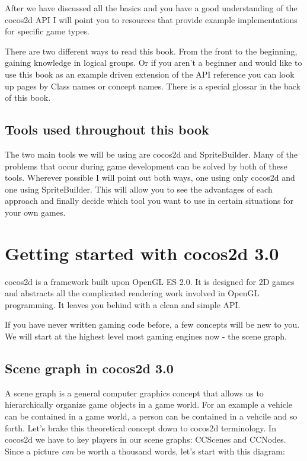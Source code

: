 \documentclass{scrreprt}
\newcommand{\cocos}{cocos2d}
\newcommand{\spriteb}{SpriteBuilder}
\begin{document}
After we have discussed all the basics and you have a good understanding of the
\cocos{} API I will point you to resources that provide example implementations
for specific game types.

There are two different ways to read this book. From the front to the beginning,
gaining knowledge in logical groups. Or if you aren't a beginner and would like
to use this book as an example driven extension of the API reference you can
look up pages by Class names or concept names. There is a special glossar in the
back of this book.

\section{Tools used throughout this book}
The two main tools we will be using are \cocos{} and \spriteb{}. Many of the
problems that occur during game development can be solved by both of these
tools. Wherever possible I will point out both ways, one using only \cocos{} and
one using \spriteb{}. This will allow you to see the advantages of each approach
and finally decide which tool you want to use in certain situations for your own
games.

\chapter{Getting started with \cocos{} 3.0}
\cocos{} is a framework built upon OpenGL ES 2.0. It is designed for 2D games
and abstracts all the complicated rendering work involved in OpenGL programming.
It leaves you behind with a clean and simple API.

If you have never written gaming code before, a few concepts will be new to you.
We will start at the highest level most gaming engines now - the scene graph.

\section{Scene graph in \cocos{} 3.0}
A scene graph is a general computer graphics concept that allows us to
hierarchically organize game objects in a game world. For an example a vehicle can be contained in a game world, a
person can be contained in a vehcile and so forth.
Let's brake this theoretical concept down to \cocos{} terminology. In
\cocos{} we have to key players in our scene graphs: CCScenes and CCNodes. Since
a picture \textit{can} be worth a thousand words, let's start with this diagram:
\end{document}
